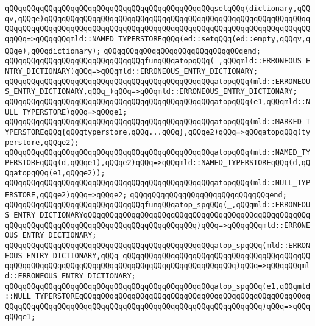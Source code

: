 \verb|qQQqqQQqqQQqqQQqqQQqqQQqqQQqqQQqqQQqqQQqqQQqqQQqsetqQQq(dictionary,qQQqv,qQQqe)qQQqqQQqqQQqqQQqqQQqqQQqqQQqqQQqqQQqqQQqqQQqqQQqqQQqqQQqqQQqqQQqqQQqqQQqqQQqqQQqqQQqqQQqqQQqqQQqqQQqqQQqqQQqqQQqqQQqqQQqqQQqqQQqqQQqqQQq=>qQQqqQQqmld::NAMED_TYPERSTOREqQQq(ed::setqQQq(ed::empty,qQQqv,qQQqe),qQQqdictionary);|\newline
\verb|qQQqqQQqqQQqqQQqqQQqqQQqqQQqqQQqend;|\newline
\newline
\verb|qQQqqQQqqQQqqQQqqQQqqQQqqQQqqQQqfunqQQqatopqQQq(_,qQQqmld::ERRONEOUS_ENTRY_DICTIONARY)qQQq=>qQQqmld::ERRONEOUS_ENTRY_DICTIONARY;|\newline
\verb|qQQqqQQqqQQqqQQqqQQqqQQqqQQqqQQqqQQqqQQqqQQqqQQqatopqQQq(mld::ERRONEOUS_ENTRY_DICTIONARY,qQQq_)qQQq=>qQQqmld::ERRONEOUS_ENTRY_DICTIONARY;|\newline
\verb|qQQqqQQqqQQqqQQqqQQqqQQqqQQqqQQqqQQqqQQqqQQqqQQqatopqQQq(e1,qQQqmld::NULL_TYPERSTORE)qQQq=>qQQqe1;|\newline
\verb|qQQqqQQqqQQqqQQqqQQqqQQqqQQqqQQqqQQqqQQqqQQqqQQqatopqQQq(mld::MARKED_TYPERSTOREqQQq{qQQqtyperstore,qQQq...qQQq},qQQqe2)qQQq=>qQQqatopqQQq(typerstore,qQQqe2);|\newline
\verb|qQQqqQQqqQQqqQQqqQQqqQQqqQQqqQQqqQQqqQQqqQQqqQQqatopqQQq(mld::NAMED_TYPERSTOREqQQq(d,qQQqe1),qQQqe2)qQQq=>qQQqmld::NAMED_TYPERSTOREqQQq(d,qQQqatopqQQq(e1,qQQqe2));|\newline
\verb|qQQqqQQqqQQqqQQqqQQqqQQqqQQqqQQqqQQqqQQqqQQqqQQqatopqQQq(mld::NULL_TYPERSTORE,qQQqe2)qQQq=>qQQqe2;|\newline
\verb|qQQqqQQqqQQqqQQqqQQqqQQqqQQqqQQqend;|\newline
\newline
\verb|qQQqqQQqqQQqqQQqqQQqqQQqqQQqqQQqfunqQQqatop_spqQQq(_,qQQqmld::ERRONEOUS_ENTRY_DICTIONARYqQQqqQQqqQQqqQQqqQQqqQQqqQQqqQQqqQQqqQQqqQQqqQQqqQQqqQQqqQQqqQQqqQQqqQQqqQQqqQQqqQQqqQQqqQQqqQQq)qQQq=>qQQqqQQqmld::ERRONEOUS_ENTRY_DICTIONARY;|\newline
\verb|qQQqqQQqqQQqqQQqqQQqqQQqqQQqqQQqqQQqqQQqqQQqqQQqatop_spqQQq(mld::ERRONEOUS_ENTRY_DICTIONARY,qQQq_qQQqqQQqqQQqqQQqqQQqqQQqqQQqqQQqqQQqqQQqqQQqqQQqqQQqqQQqqQQqqQQqqQQqqQQqqQQqqQQqqQQqqQQqqQQqqQQq)qQQq=>qQQqqQQqmld::ERRONEOUS_ENTRY_DICTIONARY;|\newline
\verb|qQQqqQQqqQQqqQQqqQQqqQQqqQQqqQQqqQQqqQQqqQQqqQQqatop_spqQQq(e1,qQQqmld::NULL_TYPERSTOREqQQqqQQqqQQqqQQqqQQqqQQqqQQqqQQqqQQqqQQqqQQqqQQqqQQqqQQqqQQqqQQqqQQqqQQqqQQqqQQqqQQqqQQqqQQqqQQqqQQqqQQqqQQqqQQq)qQQq=>qQQqqQQqe1;|\newline
